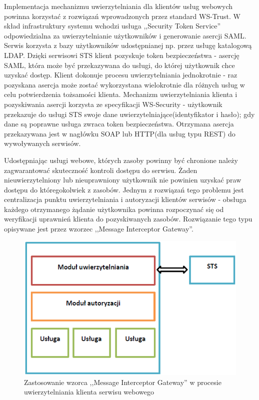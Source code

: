 		Implementacja mechanizmu uwierzytelniania dla klientów usług webowych powinna korzystać z rozwiązań wprowadzonych przez standard WS-Trust. W skład infrastruktury systemu wchodzi usługa ,,Security Token Service'' odpowiedzialna za uwierzytelnianie użytkowników i generowanie asercji SAML. Serwis korzysta z bazy użytkowników udostępnianej np. przez usługę katalogową LDAP. Dzięki serwisowi STS klient pozyskuje token bezpieczeństwa - asercję SAML, która może być przekazywana do usługi, do której użytkownik chce uzyskać dostęp. Klient dokonuje procesu uwierzytelniania jednokrotnie - raz pozyskana asercja może zostać wykorzystana wielokrotnie dla różnych usług w celu potwierdzenia tożsamości klienta. Mechanizm uwierzytelniania klienta i pozyskiwania asercji korzysta ze specyfikacji WS-Security - użytkownik przekazuje do usługi STS swoje dane uwierzytelniające(identyfikator i hasło); gdy dane są poprawne usługa zwraca token bezpieczeństwa. Otrzymana asercja przekazywana jest w nagłówku SOAP lub HTTP(dla usług typu REST) do wywoływanych serwisów.

		Udostępniając usługi webowe, których zasoby powinny być chronione należy zagwarantować skuteczność kontroli dostępu do serwisu. Żaden nieuwierzytelniony lub nieuprawniony użytkownik nie powinien uzyskać praw dostępu do któregokolwiek z zasobów. Jednym z rozwiązań tego problemu jest centralizacja punktu uwierzytelniania i autoryzacji klientów serwisów - obsługa każdego otrzymanego żądanie użytkownika powinna rozpoczynać się od weryfikacji uprawnień klienta do pozyskiwanych zasobów. Rozwiązanie tego typu opisywane jest przez wzorzec ,,Message Interceptor Gateway''. 

		\begin{figure}[h]
			\centering
			\includegraphics{img/interceptorGateway.png}
			\caption{Zastosowanie wzorca ,,Message Interceptor Gateway'' w procesie uwierzytelniania klienta serwisu webowego}
			\label{Zastosowanie wzorca ,,Message Interceptor Gateway'' w procesie uwierzytelniania klienta serwisu webowego}
		\end{figure}

